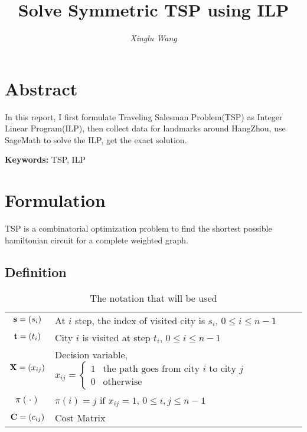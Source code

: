 \documentclass{mcmthesis}
\title{Solve Symmetric TSP using ILP}
\author{{\itshape Xinglu Wang} \quad {\itshape 3140102282} \quad {\itshape ISEE 1403, ZJU}}
\begin{document}
\maketitle
 
\setcounter{tocdepth}{2} %
\tableofcontents
		
\section*{Abstract }
In this report, I first formulate Traveling Salesman Problem(TSP) as  Integer Linear Program(ILP), then collect data for landmarks around HangZhou, use SageMath to solve the ILP, get the exact solution. 

\textbf{Keywords:} TSP, ILP
\section{Formulation}
TSP is a combinatorial optimization problem to find the shortest possible hamiltonian circuit for a complete weighted graph. %
\subsection{Definition}	 
\begin{table} 
	\centering
	{\begin{tabular}{c|l} 
	\hline
	$\mathbf{s} = (s_i)$ & At $i$ step, the index of visited city is $s_i$, $ 0 \le i \le n-1$\\
	$\mathbf{t}= (t_i)$ & City $i$ is visited at step $t_i$, $ 0 \le i \le n-1$\\ \hline \hline
	$\mathbf{X} = (x_{i j} )$ & Decision variable, $x_{ij}={\begin{cases}1&{\text{the path goes from city }}i{\text{ to city }}j\\0&{\text{otherwise}}\end{cases}}$  \\
	$\pi(\cdot )$ & $\pi(i)=j  \text{ if } x_{i j}=1$, $ 0 \le i,j \le n-1$ \\ \hline \hline
	$\mathbf{C}=(c_{ij})$ & Cost Matrix \\ 
	\hline
	\end{tabular}
	\caption{The notation that will be used}
	\label{tab:ok}}
\end{table}
\end{document}
